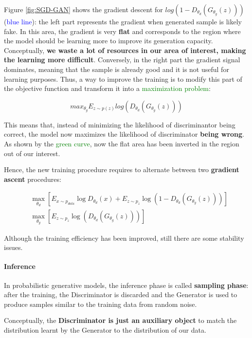 Figure \ref{fig:SGD-GAN} shows the gradient descent for
$log (1-D_{\theta_{d}}(G_{\theta_{g}}(z)))$(\textcolor{blue}{blue line}): the left part represents the gradient  when generated sample is likely fake. In this area, the gradient is very \textbf{flat} and corresponds to the region  where the model should be learning more to improve its generation capacity.  Conceptually, \textbf{we waste a lot of resources in our area of interest, making the learning more difficult}. Conversely, in the right part the gradient signal dominates, meaning that the sample is already good  and it is not useful for learning purposes. Thus, a way to improve the training is to modify this part of the objective function and transform it into a \textcolor{green}{ maximization problem}:

$$max_{\theta_{g}} E_{z\sim p(z)}log (D_{\theta_{d}}(G_{\theta_{g}}(z))) $$

This means that, instead of minimizing the likelihood of discriminantor being correct, the model now maximizes the likelihood of discriminator \textbf{being wrong}. As shown by the \textcolor{green}{green curve}, now the flat area has been inverted in the region out of our interest. 

Hence, the new training procedure requires to alternate between two \textbf{gradient ascent} procedures:

\begin{equation}
\begin{aligned}
    &\max_{\theta_{d}} \left[E_{x \sim p_{data}} \log D_{\theta_{d}}(x) + E_{z \sim p_{z}} \log (1 - D_{\theta_{d}}(G_{\theta_{g}}(z))) \right] \\
    &\max_{\theta_{g}} \left[E_{z \sim p_{z}} \log (D_{\theta_{d}}(G_{\theta_{g}}(z))) \right]
\end{aligned}
\end{equation}

Although the training efficiency has been improved, still there are some stability issues.

\paragraph{Inference}

In probabilistic generative models, the inference phase is called \textbf{sampling phase}: after the training, the Discriminator  is discarded and the Generator is used to produce samples similar to the training data from random noise.

Conceptually, the \textbf{Discriminator is just an auxiliary object} to match the distribution learnt by the Generator to the distribution of our data.




